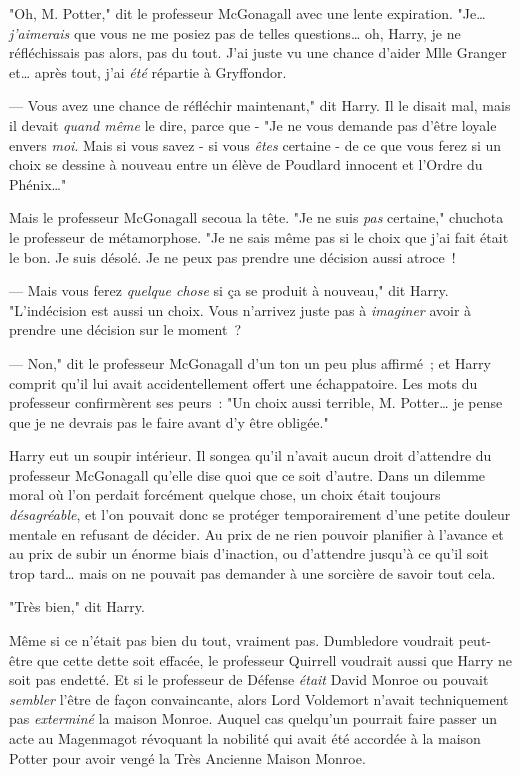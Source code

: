 "Oh, M. Potter," dit le professeur McGonagall avec une lente expiration. "Je… \emph{j'aimerais} que vous ne me posiez pas de telles questions… oh, Harry, je ne réfléchissais pas alors, pas du tout. J'ai juste vu une chance d'aider Mlle Granger et… après tout, j'ai \emph{été} répartie à Gryffondor.

--- Vous avez une chance de réfléchir maintenant," dit Harry. Il le disait mal, mais il devait \emph{quand même} le dire, parce que - "Je ne vous demande pas d'être loyale envers \emph{moi}. Mais si vous savez - si vous \emph{êtes} certaine - de ce que vous ferez si un choix se dessine à nouveau entre un élève de Poudlard innocent et l'Ordre du Phénix…"

Mais le professeur McGonagall secoua la tête. "Je ne suis \emph{pas} certaine," chuchota le professeur de métamorphose. "Je ne sais même pas si le choix que j'ai fait était le bon. Je suis désolé. Je ne peux pas prendre une décision aussi atroce~!

--- Mais vous ferez \emph{quelque chose} si ça se produit à nouveau," dit Harry. "L'indécision est aussi un choix. Vous n'arrivez juste pas à \emph{imaginer} avoir à prendre une décision sur le moment~?

--- Non," dit le professeur McGonagall d'un ton un peu plus affirmé~; et Harry comprit qu'il lui avait accidentellement offert une échappatoire. Les mots du professeur confirmèrent ses peurs~: "Un choix aussi terrible, M. Potter… je pense que je ne devrais pas le faire avant d'y être obligée."

Harry eut un soupir intérieur. Il songea qu'il n'avait aucun droit d'attendre du professeur McGonagall qu'elle dise quoi que ce soit d'autre. Dans un dilemme moral où l'on perdait forcément quelque chose, un choix était toujours \emph{désagréable}, et l'on pouvait donc se protéger temporairement d'une petite douleur mentale en refusant de décider. Au prix de ne rien pouvoir planifier à l'avance et au prix de subir un énorme biais d'inaction, ou d'attendre jusqu'à ce qu'il soit trop tard… mais on ne pouvait pas demander à une sorcière de savoir tout cela.

"Très bien," dit Harry.

Même si ce n'était pas bien du tout, vraiment pas. Dumbledore voudrait peut-être que cette dette soit effacée, le professeur Quirrell voudrait aussi que Harry ne soit pas endetté. Et si le professeur de Défense \emph{était} David Monroe ou pouvait \emph{sembler} l'être de façon convaincante, alors Lord Voldemort n'avait techniquement pas \emph{exterminé} la maison Monroe. Auquel cas quelqu'un pourrait faire passer un acte au Magenmagot révoquant la nobilité qui avait été accordée à la maison Potter pour avoir vengé la Très Ancienne Maison Monroe.

